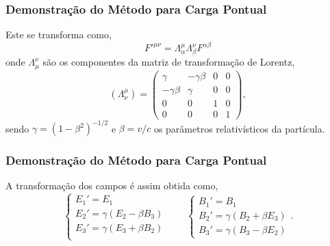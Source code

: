 \documentclass[xcolor=dvipsnames]{beamer}
\begin{document}
\begin{frame}
	\frametitle{Demonstração do Método para Carga Pontual}
	Este se transforma como, 
	\begin{equation}
		{F'}^{\mu \nu} = \Lambda _\alpha ^\mu \Lambda _\beta ^\nu F^{\alpha
		\beta}
	\end{equation}
	onde $\Lambda _\mu ^\nu$ são os componentes da matriz de transformação
	de Lorentz,
	\begin{equation}
		(\Lambda ^\mu _\nu) = \begin{pmatrix}
			\gamma & -\gamma \beta & 0 & 0 \\
			-\gamma \beta & \gamma & 0 & 0 \\
			0 & 0 & 1 & 0 \\
			0 & 0 & 0 & 1
		\end{pmatrix},
	\end{equation}
	sendo $\gamma = (1-\beta ^2)^{-1/2}$ e $\beta = v/c$ os parâmetros
	relativísticos da partícula.
\end{frame}

\begin{frame}
	\frametitle{Demonstração do Método para Carga Pontual}
	A transformação dos campos é assim obtida como,
	\begin{equation}
		\label{eq_field_trans}
		\begin{cases}
		E_1' = E_1 \\
		E_2' = \gamma (E_2 - \beta B_3) \\
		E_3' = \gamma (E_3 + \beta B_2) \\
		\end{cases} \qquad
		\begin{cases}
		B_1 ' = B_1 \\
		B_2 ' = \gamma (B_2 + \beta E_3) \\
		B_3' = \gamma(B_3 - \beta E_2)
		\end{cases}.
	\end{equation}
\end{frame}
\end{document}

